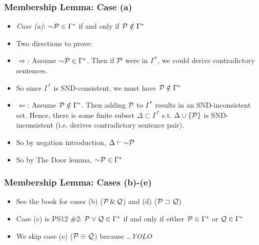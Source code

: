 \begin{frame}
\frametitle{Membership Lemma: Case (a)}

\begin{itemize}[<+->]


\item \emph{Case (a)}: $\enot \metav{P} \in \Gamma^{\ast}$ if and only if $\mathcal{P} \notin \Gamma^{\ast}$

\item Two directions to prove:

\item[] $\Rightarrow$: Assume $\enot \metav{P} \in \Gamma^{\ast}$. Then if  $\mathcal{P}$ were in $\Gamma^{\ast}$, we could derive contradictory sentences. 

\item[] So since $\Gamma^{\ast}$ is SND-consistent, we must have $\mathcal{P} \notin \Gamma^{\ast}$

\item[] $\Leftarrow$: Assume $\mathcal{P} \notin \Gamma^{\ast}$. Then adding $\mathcal{P}$ to $\Gamma^{\ast}$ results in an SND-inconsistent set. Hence, there is some finite subset $\Delta \subset \Gamma^{\ast}$ s.t. $\Delta \cup \{ \mathcal{P}\}$ is SND-inconsistent (i.e. derives contradictory sentence pair). 

\item So by negation introduction, $\Delta \vdash \enot \metav{P}$

\item So by The Door lemma, $\enot \metav{P} \in \Gamma^{\ast}$


\end{itemize}
\end{frame}

\begin{frame}
\frametitle{Membership Lemma: Cases (b)-(e)}

\begin{itemize}[<+->]

\item See the book for cases (b) ($\mathcal{P} \,\&\, \mathcal{Q}$) and (d) ($\mathcal{P} \supset \mathcal{Q}$)

\item Case (c) is PS12 \#2: $\mathcal{P} \vee \mathcal{Q} \in \Gamma^{\ast}$ if and only if either $\mathcal{P}\in \Gamma^{\ast}$ or $\mathcal{Q}\in \Gamma^{\ast}$

\item We skip case (e) ($\mathcal{P} \equiv \mathcal{Q}$) because \dots \pause \emph{YOLO}



\end{itemize}
\end{frame}

